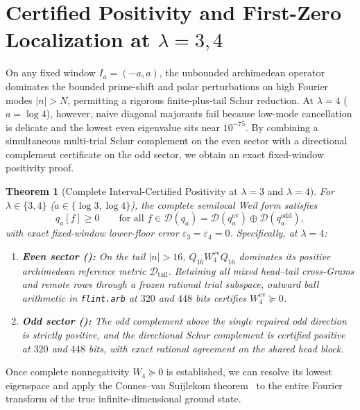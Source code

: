 \documentclass[11pt]{article}
\newtheorem{theorem}{Theorem}[section]
\theoremstyle{remark}
\begin{document}
\section{Certified Positivity and First-Zero Localization at \texorpdfstring{$\lambda = 3, 4$}{lambda = 3, 4}}
\label{sec:lambda4}

On any fixed window $I_a = (-a,a)$, the unbounded archimedean operator dominates the bounded prime-shift and polar perturbations on high Fourier modes $|n| > N$, permitting a rigorous finite-plus-tail Schur reduction. At $\lambda = 4$ ($a = \log 4$), however, naive diagonal majorants fail because low-mode cancellation is delicate and the lowest even eigenvalue sits near $10^{-75}$. By combining a simultaneous multi-trial Schur complement on the even sector with a directional complement certificate on the odd sector, we obtain an exact fixed-window positivity proof.

\begin{theorem}[Complete Interval-Certified Positivity at $\lambda = 3$ and $\lambda = 4$]
\label{thm:lambda4-positivity}
For $\lambda \in \{3, 4\}$ ($a \in \{\log 3, \log 4\}$), the complete semilocal Weil form satisfies
\begin{equation}
  q_a[f] \ge 0 \qquad \text{for all } f \in \mathcal{D}(q_a) = \mathcal{D}(q_a^{\mathrm{ev}}) \oplus \mathcal{D}(q_a^{\mathrm{odd}}),
\end{equation}
with exact fixed-window lower-floor error $\varepsilon_3 = \varepsilon_4 = 0$. Specifically, at $\lambda = 4$:
\begin{enumerate}[label=(\alph*)]
  \item \textbf{Even sector ():} On the tail $|n| > 16$, $Q_{16}W_4^{\mathrm{ev}}Q_{16}$ dominates its positive archimedean reference metric $\mathcal{D}_{\mathrm{tail}}$. Retaining all mixed head--tail cross-Grams and remote rows through a frozen rational trial subspace, outward ball arithmetic in \texttt{flint.arb} at $320$ and $448$ bits certifies $W_4^{\mathrm{ev}} \succeq 0$.
  \item \textbf{Odd sector ():} The odd complement above the single repaired odd direction is strictly positive, and the directional Schur complement is certified positive at $320$ and $448$ bits, with exact rational agreement on the shared head block.
\end{enumerate}
\end{theorem}

Once complete nonnegativity $W_4 \succeq 0$ is established, we can resolve its lowest eigenspace and apply the Connes--van Suijlekom theorem~\cite{ConnesVanSuijlekom2021} to the entire Fourier transform of the true infinite-dimensional ground state.
\end{document}

